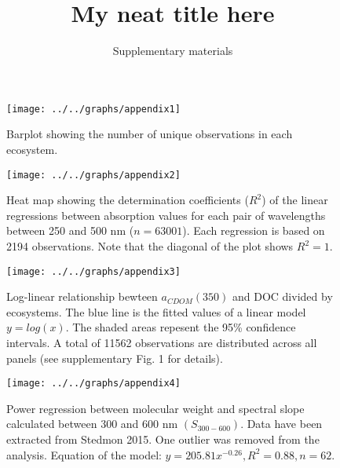 \documentclass[10pt,a4paper]{scrartcl}
\title{My neat title here}
\subtitle{Supplementary materials}
\date{}
\begin{document}
\maketitle

\begin{figure}[h]
	\centering
	\texttt{[image: ../../graphs/appendix1]}
	\caption{Barplot showing the number of unique observations in each ecosystem.}
\end{figure}

\clearpage
\newpage

\begin{figure}[h]
	\centering
	\texttt{[image: ../../graphs/appendix2]}
	\caption{Heat map showing the determination coefficients ($R^2$) of the linear regressions between absorption values for each pair of wavelengths between 250 and 500 nm ($n = 63001$). Each regression is based on 2194 observations. Note that the diagonal of the plot shows $R^2 = 1$.}
\end{figure}

\clearpage
\newpage

\begin{figure}[h]
	\centering
	\texttt{[image: ../../graphs/appendix3]}

	\caption{Log-linear relationship bewteen $a_{CDOM}(350)$ and DOC divided by ecosystems. The blue line is the fitted values of a linear model $y = log(x)$. The shaded areas repesent the 95\% confidence intervals. A total of 11562 observations are distributed across all panels (see supplementary Fig. 1 for details).}
\end{figure}

\clearpage
\newpage

\begin{figure}[h]
	\centering
	\texttt{[image: ../../graphs/appendix4]}
	\caption{Power regression between molecular weight and spectral slope calculated between 300 and 600 nm $(S_{300-600})$. Data have been extracted from Stedmon 2015. One outlier was removed from the analysis. Equation of the model: $y = 205.81x^{-0.26}, R^2 = 0.88, n = 62$.}
\end{figure}
\end{document}
